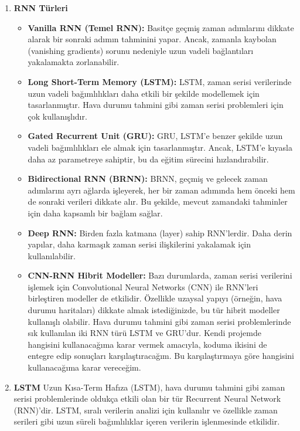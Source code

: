 \documentclass[12pt,a4paper]{article}
\begin{document}
\begin{enumerate}
\begin{figure}[htbp]
    \label{fig:yan_yana_resimler}
\end{figure}
 \newpage
 \item  {\bf\fontsize{12pt}{14pt}\selectfont RNN Türleri}\newline
 \begin{itemize}
     \item {\bf\fontsize{12pt}{14pt}\selectfont Vanilla RNN (Temel RNN):}   Basitçe geçmiş zaman adımlarını dikkate alarak bir sonraki adımın tahminini yapar. Ancak, zamanla kaybolan (vanishing gradients) sorunu nedeniyle uzun vadeli bağlantıları yakalamakta zorlanabilir.
     \item {\bf\fontsize{12pt}{14pt}\selectfont Long Short-Term Memory (LSTM):} LSTM, zaman serisi verilerinde uzun vadeli bağımlılıkları daha etkili bir şekilde modellemek için tasarlanmıştır. Hava durumu tahmini gibi zaman serisi problemleri için çok kullanışlıdır.
     \item {\bf\fontsize{12pt}{14pt}\selectfont Gated Recurrent Unit (GRU):} GRU, LSTM'e benzer şekilde uzun vadeli bağımlılıkları ele almak için tasarlanmıştır. Ancak, LSTM'e kıyasla daha az parametreye sahiptir, bu da eğitim sürecini hızlandırabilir.
     \item {\bf\fontsize{12pt}{14pt}\selectfont Bidirectional RNN (BRNN):} BRNN, geçmiş ve gelecek zaman adımlarını ayrı ağlarda işleyerek, her bir zaman adımında hem önceki hem de sonraki verileri dikkate alır. Bu şekilde, mevcut zamandaki tahminler için daha kapsamlı bir bağlam sağlar.
     \item {\bf\fontsize{12pt}{14pt}\selectfont Deep RNN:} Birden fazla katmana (layer) sahip RNN'lerdir. Daha derin yapılar, daha karmaşık zaman serisi ilişkilerini yakalamak için kullanılabilir.
     \item {\bf\fontsize{12pt}{14pt}\selectfont CNN-RNN Hibrit Modeller:} Bazı durumlarda, zaman serisi verilerini işlemek için Convolutional Neural Networks (CNN) ile RNN'leri birleştiren modeller de etkilidir. Özellikle uzaysal yapıyı (örneğin, hava durumu haritaları) dikkate almak istediğinizde, bu tür hibrit modeller kullanışlı olabilir.\newpage
    Hava durumu tahmini gibi zaman serisi problemlerinde sık kullanılan iki RNN türü LSTM ve GRU'dur. Kendi projemde hangisini kullanacağıma karar vermek amacıyla, koduma ikisini de entegre edip sonuçları karşılaştıracağım. Bu karşılaştırmaya göre hangisini kullanacağıma karar vereceğim.
 \end{itemize}
 \item {\bf\fontsize{12pt}{14pt}\selectfont LSTM}\newline\newline
Uzun Kısa-Term Hafıza (LSTM), hava durumu tahmini gibi zaman serisi problemlerinde oldukça etkili olan bir tür Recurrent Neural Network (RNN)’dir. LSTM, sıralı verilerin analizi için kullanılır ve özellikle zaman serileri gibi uzun süreli bağımlılıklar içeren verilerin işlenmesinde etkilidir\cite{lstmnedir}.


\end{enumerate}
\end{document}
